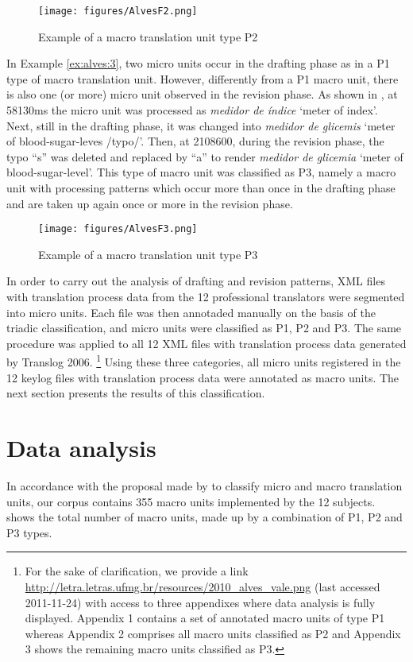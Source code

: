 \documentclass[output=paper]{LSP/langsci}
\begin{document}
\begin{figure}
\texttt{[image: figures/AlvesF2.png]}
\caption{Example of a macro translation unit type P2}
\label{fig:alves:2}
\end{figure} 
  
In Example \ref{ex:alves:3}, two micro units occur in the drafting phase as in a P1 type of macro translation unit. However, differently from a P1 macro unit, there is also one (or more) micro unit observed in the revision phase. As shown in , at 58130ms the micro unit was processed as \textit{medidor de índice} `meter of index'. Next, still in the drafting phase, it was changed into \textit{medidor de glicemis} `meter of blood-sugar-leves /typo/'. Then, at 2108600, during the revision phase, the typo ``s'' was deleted and replaced by ``a'' to render \textit{medidor de glicemia} `meter of blood-sugar-level'. This type of macro unit was classified as P3, namely a macro unit with processing patterns which occur more than once in the drafting phase and are taken up again once or more in the revision phase.

\begin{figure}
\texttt{[image: figures/AlvesF3.png]}
\caption{Example of a macro translation unit type P3 }
\label{fig:alves:3}
\end{figure} 

In order to carry out the analysis of drafting and revision patterns, XML files with translation process data from the 12 professional translators were segmented into micro units. Each file was then annotaded manually on the basis of the triadic classification, and micro units were classified as P1, P2 and P3. The same procedure was applied to all 12 XML files with translation process data generated by Translog 2006. \footnote{For the sake of clarification, we provide a link \url{http://letra.letras.ufmg.br/resources/2010_alves_vale.png} (last accessed 2011-11-24) with access to three appendixes where data analysis is fully displayed. Appendix 1 contains a set of annotated macro units of type P1 whereas Appendix 2 comprises all macro units classified as P2 and Appendix 3 shows the remaining macro units classified as P3.} Using these three categories, all micro units registered in the 12 keylog files with translation process data were annotated as macro units. The next section presents the results of this classification.

\section{Data analysis}\label{sec:alves:4}
In accordance with the proposal made by  \citet{AlvesVale2009} to classify micro and macro translation units, our corpus contains 355 macro units implemented by the 12 subjects.  shows the total number of macro units, made up by a combination of P1, P2 and P3 types.
\end{document}
